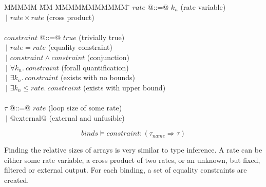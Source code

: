 \begin{tabbing}
MMMMM       \= MM \= MMMMMMMMMMM \= \kill
$rate$      \> @::=@ \> $k_n$               \> (rate variable)\\
            \> $~|$  \> $rate \times rate$  \> (cross product) \\
\\
$constraint$ \> @::=@ \> $true$                                 \> (trivially true) \\
             \> $~|$  \> $rate = rate$                          \> (equality constraint) \\
             \> $~|$  \> $constraint \wedge constraint$         \> (conjunction) \\
             \> $~|$  \> $\forall k_n.\ constraint$              \> (forall quantification) \\
             \> $~|$  \> $\exists k_n.\ constraint$              \> (exists with no bounds)\\
             \> $~|$  \> $\exists k_n \le rate.\ constraint$     \> (exists with upper bound)    \\
\\
$\tau$       \> @::=@ \> $rate$                                  \> (loop size of some rate) \\
             \> $~|$  \> @external@                              \> (external and unfusible) \\
\end{tabbing}

\newcommand{\constraint}[3]{#1 \vDash #2 : #3}
\newcommand{\inferC}[2]{
    $$\begin{array}{c}
        \infer{#1}{#2}
    \end{array}$$}
\newcommand{\ruleIC}[3]{
    \inferC
        {\constraint{#1; binds}{#2 C}{#3 ~ T}}
        {\constraint{binds}{C}{T}}}

\[ \constraint{binds}{constraint}{(\tau_{name} \Rightarrow \tau)} \]

Finding the relative sizes of arrays is very similar to type inference.
A rate can be either some rate variable, a cross product of two rates, or an unknown, but fixed, filtered or external output.
For each binding, a set of equality constraints are created.

\vspace{1em}

